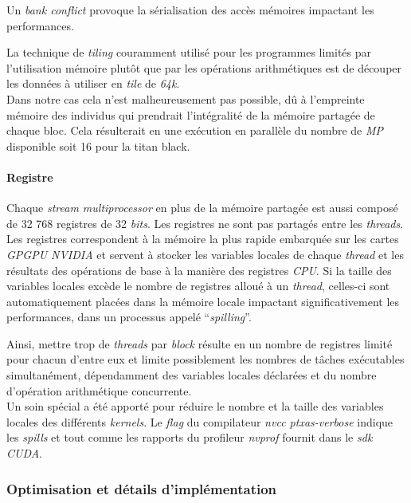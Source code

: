 \documentclass[french, 11pt]{memoir}
\begin{document}
\bigskip
Un \textit{bank conflict} provoque la sérialisation des accès mémoires
impactant les performances.

\bigskip
La technique de \emph{tiling} couramment utilisé pour les programmes
limités par l'utilisation mémoire plutôt que par les opérations
arithmétiques est de découper les données à utiliser en \emph{tile} de
\emph{64k}. \\
Dans notre cas cela n'est malheureusement pas possible, dû à l'empreinte
mémoire des individus qui prendrait l'intégralité de la mémoire partagée
de chaque bloc. Cela résulterait en une exécution en parallèle du nombre
de \emph{MP} disponible soit 16 pour la titan black.

\paragraph{Registre}\label{registre}

Chaque \emph{stream multiprocessor} en plus de la mémoire partagée est
aussi composé de 32 768 registres de 32 \emph{bits}. Les registres ne
sont pas partagés entre les \emph{threads}. Les registres correspondent
à la mémoire la plus rapide embarquée sur les cartes \emph{GPGPU NVIDIA}
et servent à stocker les variables locales de chaque \emph{thread} et
les résultats des opérations de base à la manière des registres
\emph{CPU}. Si la taille des variables locales excède le nombre de
registres alloué à un \emph{thread}, celles-ci sont automatiquement
placées dans la mémoire locale impactant significativement les
performances, dans un processus appelé ``\emph{spilling\cite{sanders2010cuda}}''. 

\bigskip
Ainsi, mettre trop de \emph{threads} par \emph{block} résulte en un
nombre de registres limité pour chacun d'entre eux et limite
possiblement les nombres de tâches exécutables simultanément,
dépendamment des variables locales déclarées et du nombre d'opération
arithmétique concurrente.\\
Un soin spécial a été apporté pour réduire le nombre et la taille des
variables locales des différents \emph{kernels}. Le \emph{flag} du
compilateur \emph{nvcc ptxas-verbose} indique les \emph{spills} et tout
comme les rapports du profileur \emph{nvprof} fournit dans le \emph{sdk
CUDA}.

\subsubsection{Optimisation et détails
d'implémentation}\label{optimisation-et-duxe9tails-dimpluxe9mentation}
\end{document}
